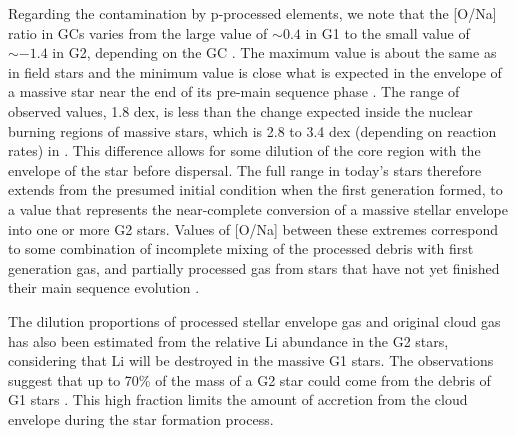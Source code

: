 \documentclass[12pt,preprint]{aastex}
\begin{document}
Regarding the contamination by p-processed elements, we note that the [O/Na] ratio
in GCs varies from the large value of $\sim 0.4$ in G1 to the small value of $\sim
-1.4$ in G2, depending on the GC \citep[$-1.4$ is for NGC 2802;][]{carretta06,prantzos06,gratton12}.
The maximum value is about the same as in
field stars and the minimum value is close what is expected in the envelope of a
massive star near the end of its pre-main sequence phase \citep{prantzos06}. The
range of observed values, 1.8 dex, is less than the change expected inside the
nuclear burning regions of massive stars, which is 2.8 to 3.4 dex (depending on
reaction rates) in \cite{dec07a}. This difference allows for some dilution of the
core region with the envelope of the star before dispersal. The full range in
today's stars therefore extends from the presumed initial condition when the first
generation formed, to a value that represents the near-complete conversion of a
massive stellar envelope into one or more G2 stars. Values of [O/Na] between these
extremes correspond to some combination of incomplete mixing of the processed
debris with first generation gas, and partially processed gas from stars that have
not yet finished their main sequence evolution \citep[Scenarios II and I
in][]{prantzos06}.

The dilution proportions of processed stellar envelope gas and original cloud gas
has also been estimated from the relative Li abundance in the G2 stars, considering
that Li will be destroyed in the massive G1 stars. The observations suggest that up
to 70\% of the mass of a G2 star could come from the debris of G1 stars
\citep{dec07b}. This high fraction limits the amount of accretion from the cloud
envelope during the star formation process.
\end{document}
